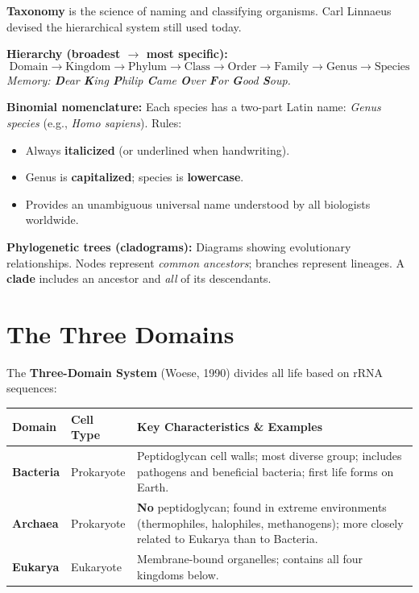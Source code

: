 \documentclass[11pt, letterpaper]{article}
\begin{document}
\textbf{Taxonomy} is the science of naming and classifying organisms. Carl Linnaeus devised
the hierarchical system still used today.

\textbf{Hierarchy (broadest $\to$ most specific):}
\[
  \text{Domain} \to \text{Kingdom} \to \text{Phylum} \to \text{Class} \to
  \text{Order} \to \text{Family} \to \text{Genus} \to \text{Species}
\]
\textit{Memory: \textbf{D}ear \textbf{K}ing \textbf{P}hilip \textbf{C}ame \textbf{O}ver
\textbf{F}or \textbf{G}ood \textbf{S}oup.}

\textbf{Binomial nomenclature:} Each species has a two-part Latin name:
\textit{Genus species} (e.g., \textit{Homo sapiens}). Rules:
\begin{itemize}[noitemsep]
  \item Always \textbf{italicized} (or underlined when handwriting).
  \item Genus is \textbf{capitalized}; species is \textbf{lowercase}.
  \item Provides an unambiguous universal name understood by all biologists worldwide.
\end{itemize}

\textbf{Phylogenetic trees (cladograms):} Diagrams showing evolutionary relationships.
Nodes represent \emph{common ancestors}; branches represent lineages. A \textbf{clade}
includes an ancestor and \emph{all} of its descendants.

\section*{The Three Domains}

The \textbf{Three-Domain System} (Woese, 1990) divides all life based on rRNA sequences:

\noindent
{\renewcommand{\arraystretch}{1.6}
\begin{tabularx}{\textwidth}{>{\bfseries\centering\arraybackslash}p{2.5cm}
                              >{\centering\arraybackslash}p{2cm}
                              >{\raggedright\arraybackslash}X}
\toprule
\rowcolor{tableheader}
\textbf{Domain} & \textbf{Cell Type} & \textbf{Key Characteristics \& Examples} \\
\midrule
\rowcolor{rowA} Bacteria & Prokaryote & Peptidoglycan cell walls; most diverse group; includes pathogens and beneficial bacteria; first life forms on Earth. \\
\rowcolor{rowB} Archaea  & Prokaryote & \textbf{No} peptidoglycan; found in extreme environments (thermophiles, halophiles, methanogens); more closely related to Eukarya than to Bacteria. \\
\rowcolor{rowA} Eukarya  & Eukaryote  & Membrane-bound organelles; contains all four kingdoms below. \\
\bottomrule
\end{tabularx}}
\end{document}
